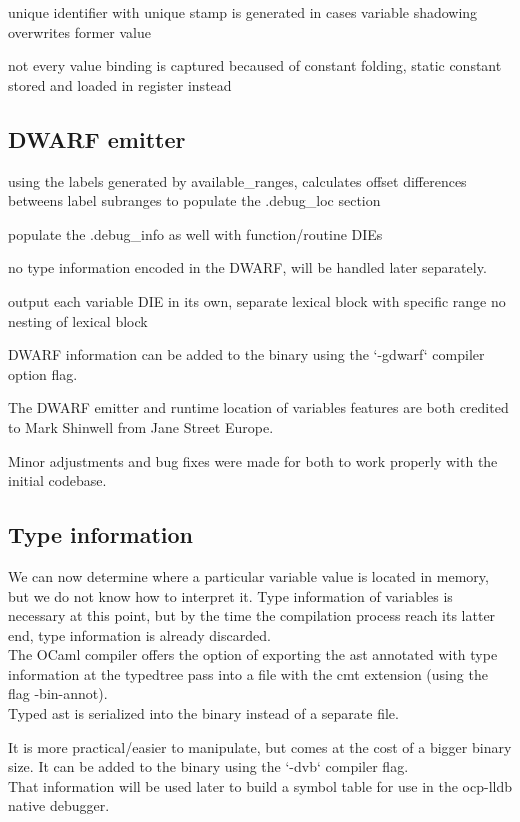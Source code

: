 unique identifier with unique stamp is generated in cases variable shadowing overwrites former value

not every value binding is captured becaused of constant folding, static
constant stored and loaded in register instead

\subsection{DWARF emitter}

using the labels generated by available\_ranges, calculates offset differences
betweens label subranges to populate the .debug\_loc section

populate the  .debug\_info as well with function/routine DIEs

no type information encoded in the DWARF, will be handled later separately.

output each variable DIE in its own, separate lexical block with specific range
no nesting of lexical block

DWARF information can be added to the binary using the `-gdwarf` compiler option flag.

The DWARF emitter and runtime location of variables features are both credited to
Mark Shinwell from Jane Street Europe.

Minor adjustments and bug fixes were made for both to work properly with the initial codebase.

\subsection{Type information}

We can now determine where a particular variable value is located in memory, but
we do not know how to interpret it. Type information of variables is necessary
at this point, but by the time the compilation process reach its latter end,
type information is already discarded. \\

The OCaml compiler offers the option of exporting the \gls{ast} annotated with type
information at the typedtree pass into a file with the cmt extension (using the
flag -bin-annot). \\

Typed \gls{ast} is serialized into the binary instead of a separate file.

It is more practical/easier to manipulate, but comes at the cost of a bigger binary
size.
It can be added to the binary using the `-dvb` compiler flag.\\

That information will be used later to build a symbol table for use in the
ocp-lldb native debugger.

